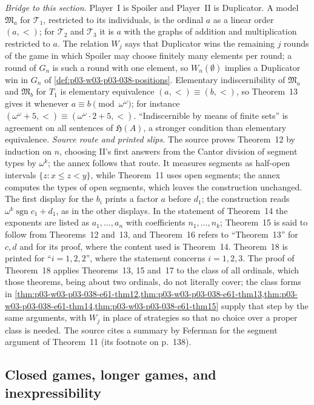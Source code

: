 \emph{Bridge to this section.} Player~I is Spoiler and Player~II is
Duplicator. A model \(\mathfrak M_a\) for \(\mathcal T_1\), restricted to
its individuals, is the ordinal \(a\) as a linear order \((a,<)\); for
\(\mathcal T_2\) and \(\mathcal T_3\) it is \(a\) with the graphs of
addition and multiplication restricted to \(a\). The relation
\(W_j\) says that Duplicator wins the remaining \(j\) rounds of the game
in which Spoiler may choose finitely many elements per round; a round of
\(G_n\) is such a round with one element, so \(W_n(\emptyset)\) implies a
Duplicator win in \(G_n\) of
\cref{def:p03-w03-p03-038-positions}. Elementary indiscernibility of
\(\mathfrak M_a\) and \(\mathfrak M_b\) for \(T_1\) is elementary
equivalence \((a,<)\equiv(b,<)\), so Theorem~13 gives it whenever
\(a\equiv b\pmod{\omega^\omega}\); for instance
\((\omega^\omega+5,<)\equiv(\omega^\omega\cdot2+5,<)\).
``Indiscernible by means of finite sets'' is agreement on all sentences of
\(\mathfrak H(A)\), a stronger condition than elementary equivalence.
\emph{Source route and printed slips.} The source proves Theorem~12 by
induction on \(n\), choosing II's first answers from the Cantor division
of segment types by \(\omega^k\); the annex follows that route. It
measures segments as half-open intervals \(\{z:x\le z<y\}\), while
Theorem~11 uses open segments; the annex computes the types of open
segments, which leaves the construction unchanged. The first display for
the \(b_i\) prints a factor \(a\) before \(d_1\); the construction reads
\(\omega^k\operatorname{sgn}c_1+d_1\), as in the other displays. In the
statement of Theorem~14 the exponents are listed as
\(a_1,\ldots,a_n\) with coefficients \(n_1,\ldots,n_k\); Theorem~15 is
said to follow from Theorems~12 and~13, and Theorem~16 refers to
``Theorem~13'' for \(c,d\) and for its proof, where the content used is
Theorem~14. Theorem~18 is printed for ``\(i=1,2,2\)'', where the
statement concerns \(i=1,2,3\). The proof of Theorem~18 applies
Theorems~13, 15 and~17 to the class of all ordinals, which those theorems,
being about two ordinals, do not literally cover; the class forms in
\cref{thm:p03-w03-p03-038-e61-thm12,thm:p03-w03-p03-038-e61-thm13,thm:p03-w03-p03-038-e61-thm14,thm:p03-w03-p03-038-e61-thm15}
supply that step by the same arguments, with \(W_j\) in place of
strategies so that no choice over a proper class is needed. The source
cites a summary by Feferman for the segment argument of Theorem~11 (its
footnote on p.~138).

\subsection{Closed games, longer games, and inexpressibility}
\label{sec:p03-w03-p03-038-long-games}


